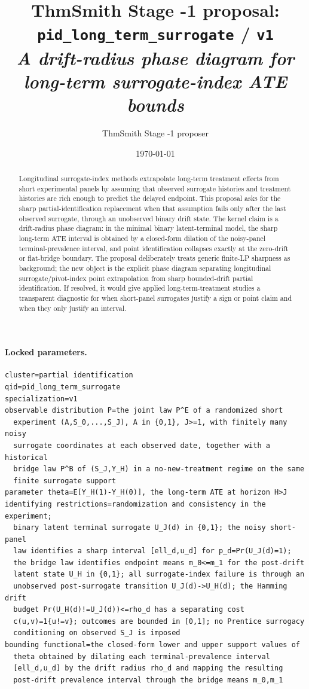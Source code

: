 \documentclass[11pt]{article}
\title{ThmSmith Stage -1 proposal: \texttt{pid\_long\_term\_surrogate} / \texttt{v1}%
  \\ \large\textit{A drift-radius phase diagram for long-term surrogate-index ATE bounds}}
\author{ThmSmith Stage -1 proposer}
\date{\today}
\theoremstyle{definition}
\theoremstyle{plain}
\theoremstyle{remark}
\begin{document}
\maketitle


\paragraph{Locked parameters.}
\begin{verbatim}
cluster=partial identification
qid=pid_long_term_surrogate
specialization=v1
observable distribution P=the joint law P^E of a randomized short
  experiment (A,S_0,...,S_J), A in {0,1}, J>=1, with finitely many noisy
  surrogate coordinates at each observed date, together with a historical
  bridge law P^B of (S_J,Y_H) in a no-new-treatment regime on the same
  finite surrogate support
parameter theta=E[Y_H(1)-Y_H(0)], the long-term ATE at horizon H>J
identifying restrictions=randomization and consistency in the experiment;
  binary latent terminal surrogate U_J(d) in {0,1}; the noisy short-panel
  law identifies a sharp interval [ell_d,u_d] for p_d=Pr(U_J(d)=1);
  the bridge law identifies endpoint means m_0<=m_1 for the post-drift
  latent state U_H in {0,1}; all surrogate-index failure is through an
  unobserved post-surrogate transition U_J(d)->U_H(d); the Hamming drift
  budget Pr(U_H(d)!=U_J(d))<=rho_d has a separating cost
  c(u,v)=1{u!=v}; outcomes are bounded in [0,1]; no Prentice surrogacy
  conditioning on observed S_J is imposed
bounding functional=the closed-form lower and upper support values of
  theta obtained by dilating each terminal-prevalence interval
  [ell_d,u_d] by the drift radius rho_d and mapping the resulting
  post-drift prevalence interval through the bridge means m_0,m_1
\end{verbatim}

\begin{abstract}
Longitudinal surrogate-index methods extrapolate long-term treatment effects from short experimental panels by assuming that observed surrogate histories and treatment histories are rich enough to predict the delayed endpoint.  This proposal asks for the sharp partial-identification replacement when that assumption fails only after the last observed surrogate, through an unobserved binary drift state.  The kernel claim is a drift-radius phase diagram: in the minimal binary latent-terminal model, the sharp long-term ATE interval is obtained by a closed-form dilation of the noisy-panel terminal-prevalence interval, and point identification collapses exactly at the zero-drift or flat-bridge boundary.  The proposal deliberately treats generic finite-LP sharpness as background; the new object is the explicit phase diagram separating longitudinal surrogate/pivot-index point extrapolation from sharp bounded-drift partial identification.  If resolved, it would give applied long-term-treatment studies a transparent diagnostic for when short-panel surrogates justify a sign or point claim and when they only justify an interval.
\end{abstract}
\end{document}
